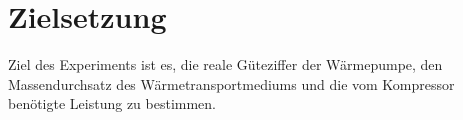 
\section{Zielsetzung}
\label{sec:Zielsetzung}

Ziel des Experiments ist es, die reale Güteziffer der Wärmepumpe, den Massendurchsatz des Wärmetransportmediums und die vom Kompressor benötigte Leistung zu bestimmen.